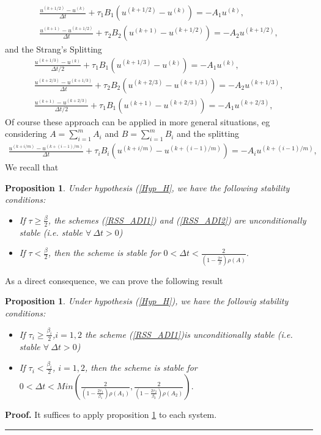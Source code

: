 \documentclass[11pt]{article}
\newenvironment{proof}[1][Proof]{\textbf{#1.} }{\ \rule{0.5em}{0.5em}}
\newtheorem{proposition}[theorem]{Proposition}
\newcommand{\Frac}[2] {\frac{\textstyle #1} {\textstyle #2}}
\begin{document}
\begin{eqnarray}
\Frac{u^{(k+1/2)}-u^{(k)}}{\Delta t} +\tau_1 B_1 (u^{(k+1/2)}-u^{(k)}) = -A_1 u^{(k)},\\
\Frac{u^{(k+1)}-u^{(k+1/2)}}{\Delta t} +\tau_2 B_2 (u^{(k+1)}-u^{(k+1/2)}) = -A_2 u^{(k+1/2)},
\label{RSS_ADI1}
\end{eqnarray}
and the Strang's Splitting
\begin{eqnarray}
\Frac{u^{(k+1/3)}-u^{(k)}}{\Delta t/2} +\tau_1 B_1 (u^{(k+1/3)}-u^{(k)}) = -A_1 u^{(k)},\\
\Frac{u^{(k+2/3)}-u^{(k+1/3)}}{\Delta t} +\tau_2 B_2 (u^{(k+2/3)}-u^{(k+1/3)}) = -A_2 u^{(k+1/3)},\\
\Frac{u^{(k+1)}-u^{(k+2/3)}}{\Delta t/2} +\tau_1 B_1 (u^{(k+1)}-u^{(k+2/3)}) = -A_1 u^{(k+2/3)},
\label{RSS_ADI2}
\end{eqnarray}
Of course these approach can be applied in more general situations, eg
considering $A=\displaystyle{\sum_{i=1}^m A_i}$ and $B =\displaystyle{\sum_{i=1}^m B_i}$ and the splitting
\begin{eqnarray}
\Frac{u^{(k+i/m)}-u^{(k+(i-1)/m)}}{\Delta t} +\tau_i B_i(u^{(k+i/m)}-u^{(k+(i-1)/m)}) = -A_i u^{(k+(i-1)/m)},
\label{RSS_ADIm}
\end{eqnarray}
We recall that
\begin{proposition}
Under hypothesis (\ref{Hyp_H}, we have the following stability conditions:
\begin{itemize}
\item If $\tau\ge \Frac{\beta}{2}$, the schemes (\ref{RSS_ADI1}) and (\ref{RSS_ADI2}) are unconditionally stable (i.e. stable $\forall \ \Delta t >0$)
\item If $\tau < \Frac{\beta}{2}$, then the scheme is stable for
$
0<\Delta t < \Frac{2}{\left(1-\Frac{2\tau}{\beta}\right)\rho(A)}.
$
\end{itemize} 
\label{RSS_Stab_lin}
\end{proposition}

As a direct consequence, we can prove the following result
\begin{proposition}
Under hypothesis (\ref{Hyp_H}), we have the followig stability conditions:
\begin{itemize}
\item If $\tau_i\ge \Frac{\beta_i}{2}$,$i=1,2$ the scheme (\ref{RSS_ADI1})is unconditionally stable (i.e. stable $\forall \ \Delta t >0$)
\item If $\tau_i < \Frac{\beta_i}{2}$, $i=1,2$, then the scheme is stable for
$
0<\Delta t < Min(\Frac{2}{\left(1-\Frac{2\tau_1}{\beta_1}\right)\rho(A_1)},\Frac{2}{\left(1-\Frac{2\tau_2}{\beta_2}\right)\rho(A_2)}).
$
\end{itemize} 
\label{RSS_Stab_ADI}
\end{proposition}
\begin{proof}
It suffices to apply proposition \ref{RSS_Stab_lin} to each system.
\end{proof}
\end{document}
